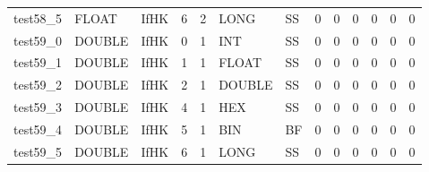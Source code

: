 \begin{longtable}{|l|l|l|p{0.5cm}|p{0.5cm}|l|p{0.5cm}|p{0.5cm}|p{0.5cm}|l|l|p{0.5cm}|l|}
test58\_5 & FLOAT & IfHK & 6 & 2 & LONG & SS & 0 & 0 & 0 & 0 & 0 & 0 \\
test59\_0 & DOUBLE & IfHK & 0 & 1 & INT & SS & 0 & 0 & 0 & 0 & 0 & 0 \\
test59\_1 & DOUBLE & IfHK & 1 & 1 & FLOAT & SS & 0 & 0 & 0 & 0 & 0 & 0 \\
test59\_2 & DOUBLE & IfHK & 2 & 1 & DOUBLE & SS & 0 & 0 & 0 & 0 & 0 & 0 \\
test59\_3 & DOUBLE & IfHK & 4 & 1 & HEX & SS & 0 & 0 & 0 & 0 & 0 & 0 \\
test59\_4 & DOUBLE & IfHK & 5 & 1 & BIN & BF & 0 & 0 & 0 & 0 & 0 & 0 \\
test59\_5 & DOUBLE & IfHK & 6 & 1 & LONG & SS & 0 & 0 & 0 & 0 & 0 & 0 \\
\hline
\end{longtable}
\normalsize
